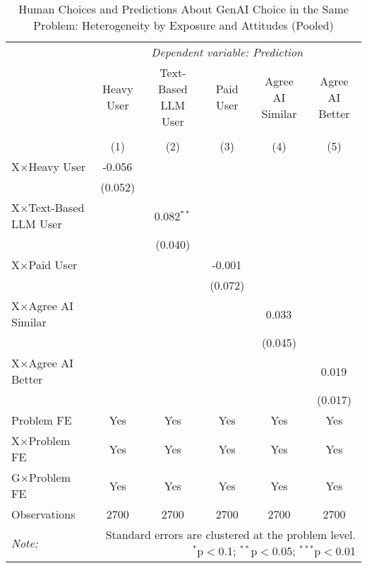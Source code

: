 \begin{table}[!htbp] \centering
  \caption{Human Choices and Predictions About GenAI Choice in the Same Problem: Heterogeneity by Exposure and Attitudes (Pooled)}
\begin{adjustbox}{scale=0.8}
\begin{tabular}{@{\extracolsep{5pt}}lccccc}
\toprule
& \multicolumn{5}{c}{\textit{Dependent variable: Prediction}} \
\cr \cline{2-6}
\\[-1.8ex] & \multicolumn{1}{c}{Heavy User} & \multicolumn{1}{c}{Text-Based LLM User} & \multicolumn{1}{c}{Paid User} & \multicolumn{1}{c}{Agree AI Similar} & \multicolumn{1}{c}{Agree AI Better}  \\
\\[-1.8ex] & (1) & (2) & (3) & (4) & (5) \\
\midrule
 X$\times$Heavy User & -0.056$^{}$ & & & & \\
& (0.052) & & & & \\
 X$\times$Text-Based LLM User & & 0.082$^{**}$ & & & \\
& & (0.040) & & & \\
 X$\times$Paid User & & & -0.001$^{}$ & & \\
& & & (0.072) & & \\
 X$\times$Agree AI Similar & & & & 0.033$^{}$ & \\
& & & & (0.045) & \\
 X$\times$Agree AI Better & & & & & 0.019$^{}$ \\
& & & & & (0.017) \\
 Problem FE & Yes & Yes & Yes & Yes & Yes \\
 X$\times$Problem FE & Yes & Yes & Yes & Yes & Yes \\
 G$\times$Problem FE & Yes & Yes & Yes & Yes & Yes \\
\midrule
 Observations & 2700 & 2700 & 2700 & 2700 & 2700 \\
\bottomrule
\textit{Note:} & \multicolumn{5}{r}{Standard errors are clustered at the problem level. $^{*}$p$<$0.1; $^{**}$p$<$0.05; $^{***}$p$<$0.01} \\
\end{tabular}
\end{adjustbox}
\label{tab:group} \end{table}